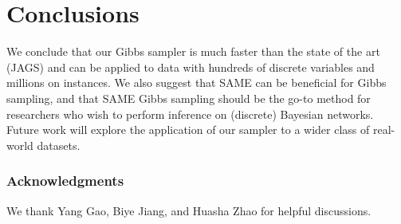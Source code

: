 \documentclass{article} %
\begin{document}
\section{Conclusions}\label{sec:conclusions}

We conclude that our Gibbs sampler is much faster than the state of
the art (JAGS) and can be applied to data with hundreds of discrete
variables and millions on instances. We also suggest that SAME can be
beneficial for Gibbs sampling, and that SAME Gibbs sampling should be
the go-to method for researchers who wish to perform inference on
(discrete) Bayesian networks. Future work will explore the application
of our sampler to a wider class of real-world datasets.


\subsubsection*{Acknowledgments}

We thank Yang Gao, Biye Jiang, and Huasha Zhao for helpful discussions.












%




\end{document}
